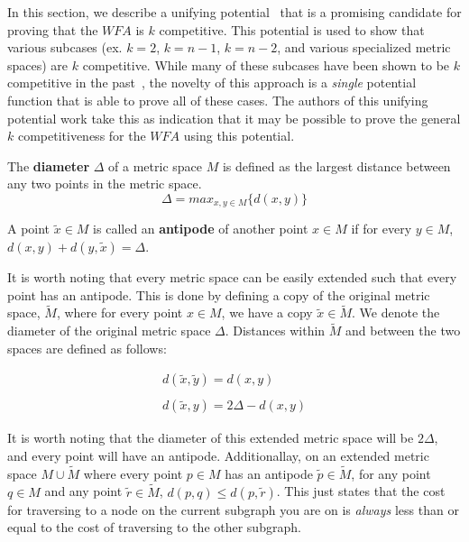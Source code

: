 In this section, we describe a unifying potential~\cite{unifyingPotential2021} that is a promising candidate for proving that the $WFA$ is $k$ competitive. This potential is used to show that various subcases (ex. $k=2$, $k=n-1$, $k=n-2$, and various specialized metric spaces) are $k$ competitive. While many of these subcases have been shown to be $k$ competitive in the past~\cite{server1991, server2009, server1996, server2004, server2002}, the novelty of this approach is a \textit{single} potential function that is able to prove all of these cases. The authors of this unifying potential work take this as indication that it may be possible to prove the general $k$ competitiveness for the $WFA$ using this potential.

\begin{definition}
    The \textbf{diameter} $\Delta$ of a metric space $M$ is defined as the largest distance between any two points in the metric space.
    \begin{equation*}
        \Delta = max_{x, y \in M} \{ d(x,y)\}
    \end{equation*}
\end{definition}

\begin{definition}
    A point $\tilde{x} \in M$ is called an \textbf{antipode} of another point $x \in M$ if for every $y \in M$, $d(x,y) + d(y, \tilde{x}) = \Delta$.
\end{definition}

It is worth noting that every metric space can be easily extended such that every point has an antipode. This is done by defining a copy of the original metric space, $\tilde{M}$, where for every point $x \in M$, we have a copy $\tilde{x} \in \tilde{M}$. We denote the diameter of the original metric space $\Delta$. Distances within $\tilde{M}$ and between the two spaces are defined as follows:

\begin{equation*}
    \begin{gathered}
        d(\tilde{x}, \tilde{y}) = d(x,y)\\ \\
        d(\tilde{x}, y) = 2\Delta - d(x,y)
    \end{gathered}
\end{equation*}

It is worth noting that the diameter of this extended metric space will be $2\Delta$, and every point will have an antipode. Additionallay, on an extended metric space $M \cup \tilde{M}$ where every point $p \in M$ has an antipode $\tilde{p} \in \tilde{M}$, for any point $q \in M$ and any point $\tilde{r} \in \tilde{M}$, $d(p,q) \leq d(p,\tilde{r})$. This just states that the cost for traversing to a node on the current subgraph you are on is \textit{always} less than or equal to the cost of traversing to the other subgraph.

